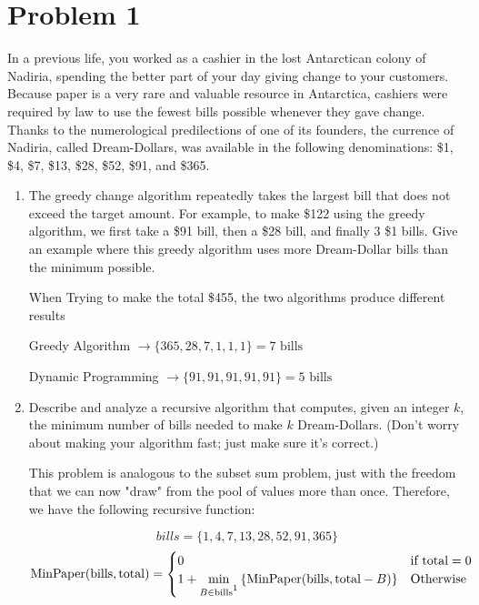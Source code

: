 \documentclass[11pt, letterpaper]{article}
\begin{document}
\section*{Problem 1}
\quad In a previous life, you worked as a cashier in the lost Antarctican colony of Nadiria, spending the better part of your day giving change to your customers. Because paper is a very rare and valuable resource in Antarctica, cashiers were required by law to use the fewest bills possible whenever they gave change. Thanks to the numerological predilections of one of its founders, the currence of Nadiria, called Dream-Dollars, was available in the following denominations: \$1, \$4, \$7, \$13, \$28, \$52, \$91, and \$365.

\begin{enumerate}
\item The greedy change algorithm repeatedly takes the largest bill that does not exceed the target amount. For example, to make \$122 using the greedy algorithm, we first take a \$91 bill, then a \$28 bill, and finally 3 \$1 bills. Give an example where this greedy algorithm uses more Dream-Dollar bills than the minimum possible.

When Trying to make the total \$455, the two algorithms produce different results 


\begin{center}
Greedy Algorithm $\rightarrow \{ 365, 28, 7, 1, 1, 1 \} = 7 \text{ bills}$

Dynamic Programming $\rightarrow \{ 91, 91, 91, 91, 91 \} = 5 \text{ bills}$
\end{center}

\item Describe and analyze a recursive algorithm that computes, given an integer $k$, the minimum number of bills needed to make $k$ Dream-Dollars. (Don't worry about making your algorithm fast; just make sure it's correct.)

\quad This problem is analogous to the subset sum problem, just with the freedom that we can now "draw" from the pool of values more than once. Therefore, we have the following recursive function:

$$ bills = \{1, 4, 7, 13, 28, 52, 91, 365 \} $$
\[
\text{MinPaper}(\text{bills}, \text{total}) = 
\begin{cases}
	0 & \text{if } \text{total} = 0 \\
	1 + \underset{B \in \text{bills} \footnotemark}{\min} \left\{ \text{MinPaper}(\text{bills}, \text{total}-B) \right\} & \text{Otherwise} \\
\end{cases}
\]


\end{enumerate}
\end{document}
